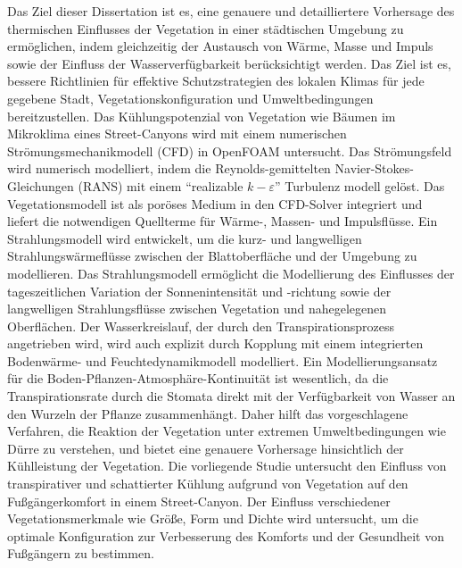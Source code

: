 {{Das Ziel dieser Dissertation ist es, eine genauere und detailliertere Vorhersage des thermischen Einflusses der Vegetation in einer städtischen Umgebung zu ermöglichen, indem gleichzeitig der Austausch von Wärme, Masse und Impuls sowie der Einfluss der Wasserverfügbarkeit berücksichtigt werden. Das Ziel ist es, bessere Richtlinien für effektive Schutzstrategien des lokalen Klimas für jede gegebene Stadt, Vegetationskonfiguration und Umweltbedingungen bereitzustellen. Das Kühlungspotenzial von Vegetation wie Bäumen im Mikroklima eines Street-Canyons wird mit einem numerischen Strömungsmechanikmodell (CFD) in OpenFOAM untersucht. Das Strömungsfeld wird numerisch modelliert, indem die Reynolds-gemittelten Navier-Stokes-Gleichungen (RANS) mit einem ``realizable $ k- \varepsilon $'' Turbulenz modell gelöst. Das Vegetationsmodell ist als poröses Medium in den CFD-Solver integriert und liefert die notwendigen Quellterme für Wärme-, Massen- und Impulsflüsse. Ein Strahlungsmodell wird entwickelt, um die kurz- und langwelligen Strahlungswärmeflüsse zwischen der Blattoberfläche und der Umgebung zu modellieren. Das Strahlungsmodell ermöglicht die Modellierung des Einflusses der tageszeitlichen Variation der Sonnenintensität und -richtung sowie der langwelligen Strahlungsflüsse zwischen Vegetation und nahegelegenen Oberflächen. Der Wasserkreislauf, der durch den Transpirationsprozess angetrieben wird, wird auch explizit durch Kopplung mit einem integrierten Bodenwärme- und Feuchtedynamikmodell modelliert. Ein Modellierungsansatz für die Boden-Pflanzen-Atmosphäre-Kontinuität ist wesentlich, da die Transpirationsrate durch die Stomata direkt mit der Verfügbarkeit von Wasser an den Wurzeln der Pflanze zusammenhängt. Daher hilft das vorgeschlagene Verfahren, die Reaktion der Vegetation unter extremen Umweltbedingungen wie Dürre zu verstehen, und bietet eine genauere Vorhersage hinsichtlich der Kühlleistung der Vegetation. Die vorliegende Studie untersucht den Einfluss von transpirativer und schattierter Kühlung aufgrund von Vegetation auf den Fußgängerkomfort in einem Street-Canyon. Der Einfluss verschiedener Vegetationsmerkmale wie Größe, Form und Dichte wird untersucht, um die optimale Konfiguration zur Verbesserung des Komforts und der Gesundheit von Fußgängern zu bestimmen.}
}


\vfill

\pagebreak

\endgroup

\vfill
